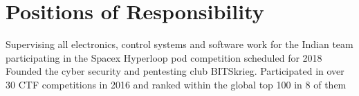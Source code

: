 \documentclass[]{illustris-resume-openfont}
\begin{document}
\begin{minipage}[t]{0.66\textwidth}






\section{Positions of Responsibility}
Supervising all electronics, control systems and software work for the Indian team participating in the Spacex Hyperloop pod competition scheduled for 2018\\
\sectionsep
{}
Founded the cyber security and pentesting club BITSkrieg. Participated in over 30 CTF competitions in 2016 and ranked within the global top 100 in 8 of them


\end{minipage}
\end{document}
